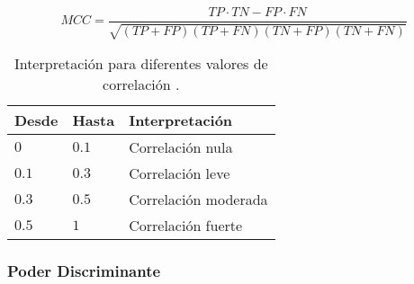 \bigbreak

\begin{equation}
    MCC = \frac{TP \cdot TN - FP \cdot FN}{\sqrt{(TP+FP)(TP+FN)(TN+FP)(TN+FN)}}
    \label{eq:MCC}
\end{equation}

\bigbreak


\bigbreak

\begin{table}[htp]
    \small
    \centering
    \begin{tabular}{l l l}
        Desde             & \hspace{10pt}Hasta             & \hspace{10pt}Interpretación       \\\hline
        $0$               & \hspace{10pt}$0.1$             & \hspace{10pt}Correlación nula     \\\hline
        $0.1$             & \hspace{10pt}$0.3$             & \hspace{10pt}Correlación leve     \\\hline
        $0.3$             & \hspace{10pt}$0.5$             & \hspace{10pt}Correlación moderada \\\hline
        $0.5$             & \hspace{10pt}$1$               & \hspace{10pt}Correlación fuerte   \\\hline
    \end{tabular}
    \caption{Interpretación para diferentes valores de correlación \cite{Pearson2021}.}
    \label{tab:3}
\end{table}


\subsubsection{Poder Discriminante}

